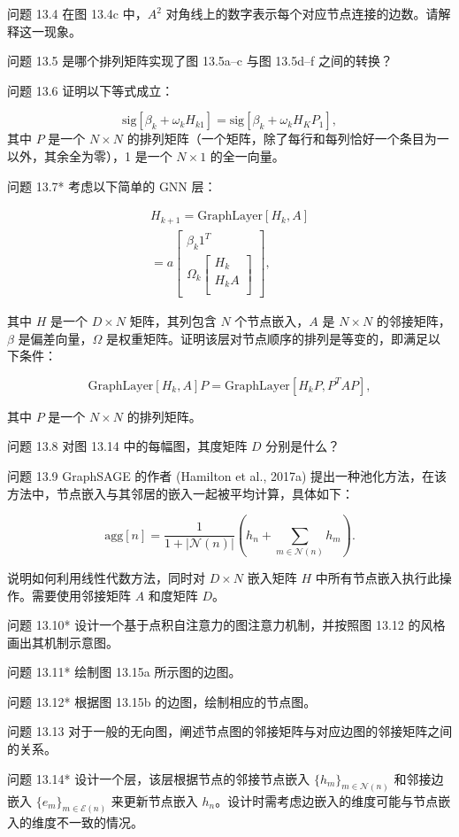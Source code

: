 问题 13.4 在图 13.4c 中，\(A^2\) 对角线上的数字表示每个对应节点连接的边数。请解释这一现象。

问题 13.5 是哪个排列矩阵实现了图 13.5a–c 与图 13.5d–f 之间的转换？

问题 13.6 证明以下等式成立：

\begin{equation}
\text{sig}[\beta_k + \omega_k H_{k1}] = \text{sig}[\beta_k + \omega_k H_K P_{1}], 
\end{equation}
其中 \(P\) 是一个 \(N \times N\) 的排列矩阵（一个矩阵，除了每行和每列恰好一个条目为一以外，其余全为零），1 是一个 \(N \times 1\) 的全一向量。

问题 13.7* 考虑以下简单的 GNN 层：


\begin{align}
H_{k+1} = \text{GraphLayer}[H_k, A] \\
= a \left[
\begin{array}{c}
\beta_k 1^T \\
\Omega_k \left[ \begin{array}{c}
H_k \\
H_k A \\
\end{array} \right]
\end{array}
\right], 
\end{align} 


其中 \(H\) 是一个 \(D \times N\) 矩阵，其列包含 \(N\) 个节点嵌入，\(A\) 是 \(N \times N\) 的邻接矩阵，\(\beta\) 是偏差向量，\(\Omega\) 是权重矩阵。证明该层对节点顺序的排列是等变的，即满足以下条件：

\begin{equation}
\text{GraphLayer}[H_k, A]P = \text{GraphLayer}[H_k P, P^T AP], 
\end{equation}

其中 \(P\) 是一个 \(N \times N\) 的排列矩阵。

问题 13.8 对图 13.14 中的每幅图，其度矩阵 \(D\) 分别是什么？

问题 13.9 GraphSAGE 的作者 (Hamilton et al., 2017a) 提出一种池化方法，在该方法中，节点嵌入与其邻居的嵌入一起被平均计算，具体如下：

\begin{equation}
\text{agg}[n] = \frac{1}{1 + |\mathcal{N}(n)|} \left( h_n + \sum_{m \in \mathcal{N}(n)} h_m \right). 
\end{equation}

说明如何利用线性代数方法，同时对 \(D \times N\) 嵌入矩阵 \(H\) 中所有节点嵌入执行此操作。需要使用邻接矩阵 \(A\) 和度矩阵 \(D\)。

问题 13.10* 设计一个基于点积自注意力的图注意力机制，并按照图 13.12 的风格画出其机制示意图。

问题 13.11* 绘制图 13.15a 所示图的边图。

问题 13.12* 根据图 13.15b 的边图，绘制相应的节点图。

问题 13.13 对于一般的无向图，阐述节点图的邻接矩阵与对应边图的邻接矩阵之间的关系。

问题 13.14* 设计一个层，该层根据节点的邻接节点嵌入 \(\{h_m\}_{m\in\mathcal{N}(n)}\) 和邻接边嵌入 \(\{e_m\}_{m\in\mathcal{E}(n)}\) 来更新节点嵌入 \(h_n\)。设计时需考虑边嵌入的维度可能与节点嵌入的维度不一致的情况。


